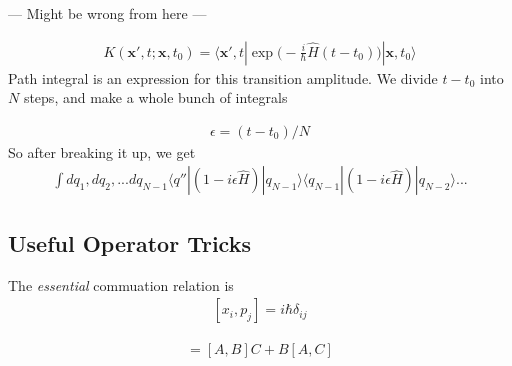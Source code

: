 --- Might be wrong from here ---

\begin{align}
    K(\textbf{x}', t;\textbf{x},t_0) = \langle \textbf{x}', t| \exp\Big(-\frac{i}{\hbar}\hat{H}(t-t_0)\Big)|\textbf{x},t_0\rangle
\end{align}
Path integral is an expression for this transition amplitude. We divide $t-t_0$ into $N$ steps, and make a whole bunch of integrals

\begin{align}
    \epsilon = (t-t_0)/N 
\end{align}
So after breaking it up, we get
\begin{align}
    \int dq_1, dq_2, ... dq_{N-1} \langle q''|(1-i\epsilon\hat{H})|q_{N-1}\rangle\langle q_{N-1}|(1-i\epsilon\hat{H})|q_{N-2}\rangle  ...
\end{align}
 









\subsection{Useful Operator Tricks}

The \emph{essential} commuation relation is
\begin{align}
\boxed{[x_i,p_j] = i\hbar\delta_{ij}}
\end{align}




\begin{align}
[A,BC] = [A,B]C + B[A,C]
\end{align}


